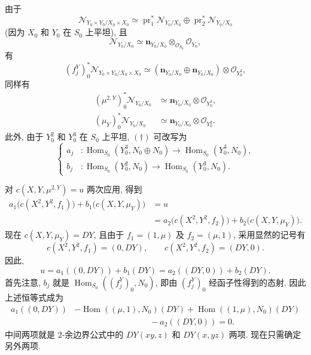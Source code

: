 由于
\[
 \mathscr N_{Y_0\times Y_0/X_0\times X_0}
 \simeq
 \operatorname{pr}_1^*\mathscr N_{Y_0/X_0}
 \oplus
 \operatorname{pr}_2^*\mathscr N_{Y_0/X_0}
\]
(因为 \(X_0\) 和 \(Y_0\) 在 \(S_0\) 上平坦), 且
\[
 \mathscr N_{Y_0/X_0}
 \simeq
 \mathbf n_{Y_0/X_0}\otimes_{\mathscr O_{S_0}}\mathscr O_{Y_0},
\]
有
\[
 (f_j^Y)_0^*\mathscr N_{Y_0\times Y_0/X_0\times X_0}
 \simeq
 (\mathbf n_{Y_0/X_0}\oplus \mathbf n_{Y_0/X_0})
 \otimes\mathscr O_{Y_0^3},
\]
同样有
\[
 \begin{aligned}
 (\mu^{2,Y})_0^*\mathscr N_{Y_0/X_0}
 &\simeq \mathbf n_{Y_0/X_0}\otimes\mathscr O_{Y_0^3},\\
 (\mu_Y)_0^*\mathscr N_{Y_0/X_0}
 &\simeq \mathbf n_{Y_0/X_0}\otimes\mathscr O_{Y_0^2}.
 \end{aligned}
\]
此外, 由于 \(Y_0^2\) 和 \(Y_0^3\) 在 \(S_0\) 上平坦,
\((\dagger)\) 可改写为
\begin{equation}
\tag{\(\ddagger\)}\label{sga3:iii:paragraph:4-19:equation:ddagger}
\left\{
\begin{aligned}
 a_j&:\operatorname{Hom}_{S_0}(Y_0^3,N_0\oplus N_0)
       \longrightarrow\operatorname{Hom}_{S_0}(Y_0^3,N_0),\\
 b_j&:\operatorname{Hom}_{S_0}(Y_0^2,N_0)
       \longrightarrow\operatorname{Hom}_{S_0}(Y_0^3,N_0).
\end{aligned}
\right.
\end{equation}

对 \(c(X,Y,\mu^{2,Y})=u\) 两次应用, 得到
\[
 \begin{aligned}
 a_1\bigl(c(X^2,Y^2,f_1)\bigr)
 +b_1\bigl(c(X,Y,\mu_Y)\bigr)
 &=u\\
 &=a_2\bigl(c(X^2,Y^2,f_2)\bigr)
 +b_2\bigl(c(X,Y,\mu_Y)\bigr).
 \end{aligned}
\]
现在 \(c(X,Y,\mu_Y)=DY\), 且由于
\(f_1=(1,\mu)\) 及 \(f_2=(\mu,1)\), 采用显然的记号有
\[
 c(X^2,Y^2,f_1)=(0,DY),
 \qquad
 c(X^2,Y^2,f_2)=(DY,0).
\]
因此,
\[
 u=a_1((0,DY))+b_1(DY)
  =a_2((DY,0))+b_2(DY).
\]
首先注意, \(b_j\) 就是
\(\operatorname{Hom}_{S_0}((f_j^Y)_0,N_0)\),
即由 \((f_j^Y)_0\) 经函子性得到的态射. 因此上述恒等式成为
\[
 \begin{aligned}
 a_1((0,DY))
 &-\operatorname{Hom}((\mu,1),N_0)(DY)
 +\operatorname{Hom}((1,\mu),N_0)(DY)\\
 &\hspace{9em}-a_2((DY,0))=0.
 \end{aligned}
\]
中间两项就是 \(2\)-余边界公式中的
\(DY(xy,z)\) 和 \(DY(x,yz)\) 两项.
现在只需确定另外两项.

